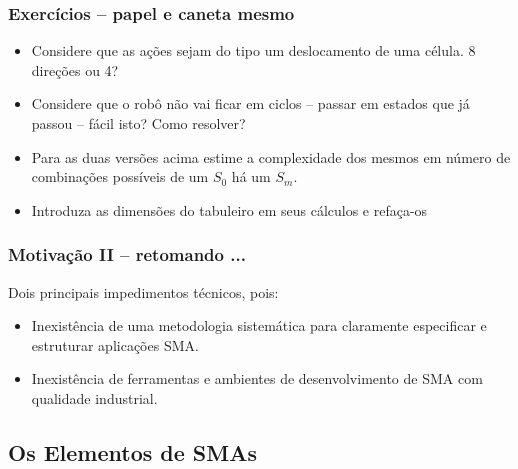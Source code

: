 \begin{frame}

\frametitle{Exercícios -- papel e caneta mesmo}
   
\begin{block}{}

  \begin{itemize}
  \item Considere que as ações sejam do tipo um deslocamento de uma célula. 8 direções ou 4?
  \pause
  \item Considere que o robô não vai ficar em ciclos -- passar em estados que já passou -- fácil isto? Como resolver?
  \pause
  
  \item   Para as duas versões acima estime a complexidade dos mesmos em número
  de combinações possíveis de um $S_0$ há um $S_m$.
  \pause
  
   \item Introduza as dimensões do tabuleiro em seus cálculos e refaça-os
  \end{itemize}  
  
\end{block}
   
\end{frame}



\begin{frame}

    \frametitle{Motivação II -- retomando ...}
   Dois principais impedimentos técnicos, pois:
  \begin{itemize}
  \pause
  \item Inexistência de uma metodologia sistemática para 
      claramente especificar e estruturar aplicações SMA.
  \pause
  \item Inexistência de ferramentas e ambientes de 
desenvolvimento de SMA com qualidade industrial.
    
  \end{itemize}

\end{frame}


\subsection{Os Elementos de SMAs}

